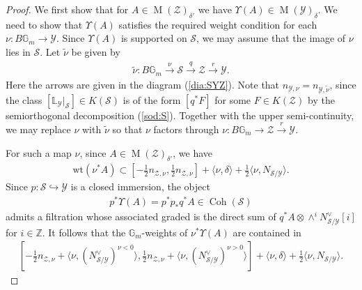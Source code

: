 \documentclass [11pt,oneside,a4paper,mathscr]{amsart}
\theoremstyle{definition}
\newcommand{\Y}{\mathcal{Y}}
\newcommand{\MM}{\operatorname{M}}
\newcommand{\bgm}{B\mathbb{G}_m}
\newcommand{\Coh}{\operatorname{Coh}}
\begin{document}
\begin{proof}
	We first show that for $A \in \MM(\mathcal{Z})_{\delta'}$
 we have $\Upsilon(A) \in \MM(\Y)_{\delta}$. 
 We need to show that 
	$\Upsilon(A)$ satisfies the required weight condition for each 
	$\nu \colon \bgm \to \mathcal{Y}$. Since $\Upsilon(A)$ is supported 
	on $\mathcal{S}$, we may assume that the image of $\nu$ lies in $\mathcal{S}$. 
    Let $\widetilde{\nu}$ be given by 
    \begin{align*}
        \widetilde{\nu} \colon \bgm  \stackrel{\nu}{\to} \mathcal{S} 
        \stackrel{q}{\to} \mathcal{Z} \stackrel{r}{\to} \mathcal{Y}. 
    \end{align*}
    Here the arrows are given in the diagram (\ref{dia:SYZ}).
    Note that $n_{\mathcal{Y}, \nu}=n_{\mathcal{Y}, \widetilde{\nu}}$, 
    since the class $[\mathbb{L}_{\Y}|_{\mathcal{S}}]\in K(\mathcal{S})$
    is of the form $[q^* F]$ for some $F \in K(\mathcal{Z})$ by the semiorthogonal decomposition (\ref{sod:S}). Together with the upper semi-continuity, we may replace 
    $\nu$ with $\widetilde{\nu}$ 
    so that 
	$\nu$ factors through $\nu \colon \bgm \to \mathcal{Z} \stackrel{r}{\to} \mathcal{Y}$. 
	
	For such a map $\nu$, since $A \in \MM(\mathcal{Z})_{\delta'}$, we have 
	\begin{align}\label{weight:1}
		\mathrm{wt}(\nu^{\ast}A) \subset \left[-\frac{1}{2}n_{\mathcal{Z}, \nu}, 
		\frac{1}{2}n_{\mathcal{Z}, \nu}  \right]+\langle \nu, \delta\rangle+\frac{1}{2}\langle \nu, N_{\mathcal{S}/\mathcal{Y}}\rangle.		\end{align}
	Since $p \colon \mathcal{S} \hookrightarrow \mathcal{Y}$ is a closed immersion, 
 the object 
 \begin{align*}p^{\ast}\Upsilon(A)=p^{\ast}p_{\ast}q^{\ast}A \in \Coh(\mathcal{S})
 \end{align*}
 admits a filtration whose associated graded is 
	the direct sum of $q^{\ast}A \otimes \wedge^i N_{\mathcal{S}/\mathcal{Y}}^{\vee}[i]$
 for $i\in \mathbb{Z}$. It follows that 
	the $\mathbb{G}_m$-weights of $\nu^{\ast}\Upsilon(A)$ are contained in 
	\begin{align}\label{weight:2}
		\left[-\frac{1}{2}n_{\mathcal{Z}, \nu}+\langle \nu, (N_{\mathcal{S}/\mathcal{Y}}^{\vee})^{\nu<0} \rangle, 
		\frac{1}{2}n_{\mathcal{Z}, \nu}+\langle \nu, (N_{\mathcal{S}/\mathcal{Y}}^{\vee})^{\nu>0}\rangle
		 \right]+\langle \nu, \delta\rangle+\frac{1}{2}\langle \nu, N_{\mathcal{S}/\mathcal{Y}}\rangle.
		\end{align}
        

\end{proof}
\end{document}
